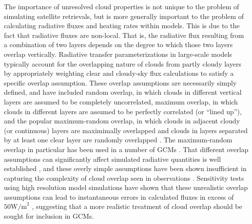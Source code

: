 The importance of unresolved cloud properties is not unique to the
problem of simulating satellite retrievals, but is more generally
important to the problem of calculating radiative fluxes and heating
rates within models. This is due to the fact that radiative fluxes are
non-local. That is, the radiative flux resulting from a combination of
two layers depends on the degree to which those two layers overlap
vertically. Radiative transfer parameterizations in large-scale models
typically account for the overlapping nature of clouds from partly
cloudy layers by appropriately weighting clear and cloudy-sky flux
calculations to satisfy a specific overlap assumption. These overlap
assumptions are necessarily simply defined, and have included random
overlap, in which clouds in different vertical layers are assumed to be
completely uncorrelated, maximum overlap, in which clouds in different
layers are assumed to be perfectly correlated (or ``lined up''), and the
popular maximum-random overlap, in which clouds in adjacent cloudy (or
continuous) layers are maximimally overlapped and clouds in layers
separated by at least one clear layer are randomly overlapped
\citep{geleyn_and_hollingsworth_1979, tian_and_curry_1989}. The
maximum-random overlap in particular has been used in a number of GCMs
\citep[e.g.,][]{collins_et_al_2004, neale_et_al_2010a, neale_et_al_2010b}.
That different overlap assumptions can significantly affect simulated
radiative quantities is well established
\citep[e.g.,][]{morcrette_and_fouquart_1986, stubenrauch_et_al_1997, barker_et_al_1999},
and these overly simple assumptions have been shown insufficient in
capturing the complexity of cloud overlap seen in observations
\citep{hogan_and_illingworth_2000, mace_and_benson-troth_2002, barker_2008}.
Sensitivity tests using high resolution model simulations have shown
that these unrealistic overlap assumptions can lead to instantaneous
errors in calculated fluxes in excess of \(50 \textrm{W/m}^2\)
\citep{barker_et_al_1999, wu_and_liang_2005}, suggesting that a more
realistic treatment of cloud overlap should be sought for inclusion in
GCMs.

